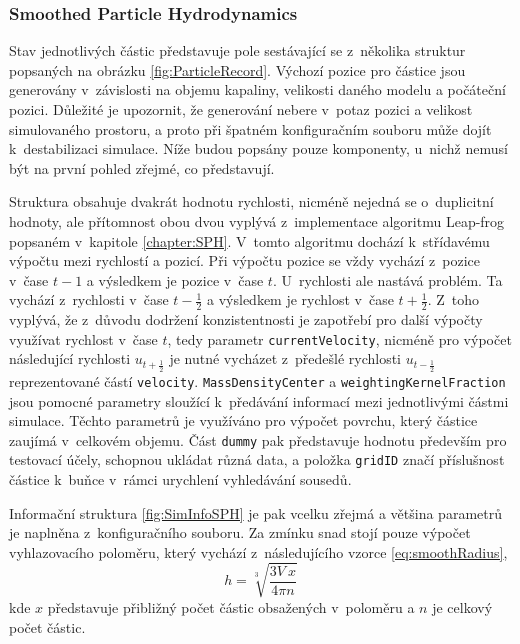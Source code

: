 \subsubsection{Smoothed Particle Hydrodynamics}
Stav jednotlivých částic představuje pole sestávající se z~několika struktur popsaných na obrázku \ref{fig:ParticleRecord}. Výchozí pozice pro částice jsou generovány v~závislosti na objemu kapaliny, velikosti daného modelu a počáteční pozici. Důležité je upozornit, že generování nebere v~potaz pozici a velikost simulovaného prostoru, a proto při špatném konfiguračním souboru může dojít k~destabilizaci simulace. Níže budou popsány pouze komponenty, u~nichž nemusí být na první pohled zřejmé, co představují. 

Struktura obsahuje dvakrát hodnotu rychlosti, nicméně nejedná se o~duplicitní hodnoty, ale přítomnost obou dvou vyplývá z~implementace algoritmu Leap-frog popsaném v~kapitole \ref{chapter:SPH}. V~tomto algoritmu dochází k~střídavému výpočtu mezi rychlostí a pozicí. Při výpočtu pozice se vždy vychází z~pozice v~čase $t-1$ a výsledkem je pozice v~čase $t$. U~rychlosti ale nastává problém. Ta vychází z~rychlosti v~čase $t-\frac{1}{2}$ a výsledkem je rychlost v~čase $t+\frac{1}{2}$. Z~toho vyplývá, že z~důvodu dodržení konzistentnosti je zapotřebí pro další výpočty využívat rychlost v~čase $t$, tedy parametr \texttt{currentVelocity}, nicméně pro výpočet následující rychlosti $u_{t+\frac{1}{2}}$ je nutné vycházet z~předešlé rychlosti $u_{t-\frac{1}{2}}$ reprezentované částí \texttt{velocity}. \texttt{MassDensityCenter} a \texttt{weightingKernelFraction} jsou pomocné parametry sloužící k~předávání informací mezi jednotlivými částmi simulace. Těchto parametrů je využíváno pro výpočet povrchu, který částice zaujímá v~celkovém objemu. Část \texttt{dummy} pak představuje hodnotu především pro testovací účely, schopnou ukládat různá data, a položka \texttt{gridID} značí příslušnost částice k~buňce v~rámci urychlení vyhledávání sousedů.

Informační struktura \ref{fig:SimInfoSPH} je pak vcelku zřejmá a většina parametrů je naplněna z~konfiguračního souboru. Za zmínku snad stojí pouze výpočet vyhlazovacího poloměru, který vychází z~následujícího vzorce \ref{eq:smoothRadius},
\begin{equation}
    h=\sqrt[3]{\frac{3 V~x}{4 \pi n}}
    \label{eq:smoothRadius}
\end{equation}
kde $x$ představuje přibližný počet částic obsažených v~poloměru a $n$ je celkový počet částic.

